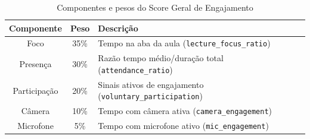 \begin{table}[ht]
    \centering
    \vspace{0.5cm}
    \begin{tabular}{|c|c|l|}
        \hline
        Componente & Peso & Descrição \\
        \hline
        Foco & 35\% & Tempo na aba da aula (\texttt{lecture\_focus\_ratio}) \\
        Presença & 30\% & Razão tempo médio/duração total (\texttt{attendance\_ratio}) \\
        Participação & 20\% & Sinais ativos de engajamento (\texttt{voluntary\_participation}) \\
        Câmera & 10\% & Tempo com câmera ativa (\texttt{camera\_engagement}) \\
        Microfone & 5\% & Tempo com microfone ativo (\texttt{mic\_engagement}) \\
        \hline
    \end{tabular}
    \caption{Componentes e pesos do Score Geral de Engajamento}
    \label{tab:engagement_score_components}
\end{table}